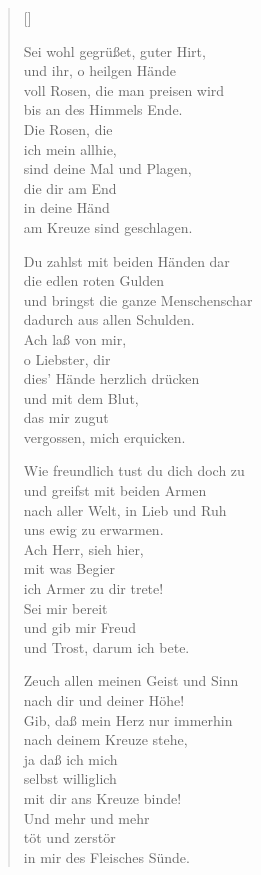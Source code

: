 \begin{multicols}{2}
\settowidth{\versewidth}{Wie freundlich tust du dich doch zu}
\begin{verse}[\versewidth]


 Sei wohl gegrüßet, guter Hirt,\\
und ihr, o heilgen Hände\\
voll Rosen, die man preisen wird\\
bis an des Himmels Ende.\\
Die Rosen, die\\
ich mein allhie,\\
sind deine Mal und Plagen,\\
die dir am End\\
in deine Händ\\
am Kreuze sind geschlagen.

 Du zahlst mit beiden Händen dar\\
die edlen roten Gulden\\
und bringst die ganze Menschenschar\\
dadurch aus allen Schulden.\\
Ach laß von mir,\\
o Liebster, dir\\
dies' Hände herzlich drücken\\
und mit dem Blut,\\
das mir zugut\\
vergossen, mich erquicken.

 Wie freundlich tust du dich doch zu\\
und greifst mit beiden Armen\\
nach aller Welt, in Lieb und Ruh\\
uns ewig zu erwarmen.\\
Ach Herr, sieh hier,\\
mit was Begier\\
ich Armer zu dir trete!\\
Sei mir bereit\\
und gib mir Freud\\
und Trost, darum ich bete.

 Zeuch allen meinen Geist und Sinn\\
nach dir und deiner Höhe!\\
Gib, daß mein Herz nur immerhin\\
nach deinem Kreuze stehe,\\
ja daß ich mich\\
selbst williglich\\
mit dir ans Kreuze binde!\\
Und mehr und mehr\\
töt und zerstör\\
in mir des Fleisches Sünde.
\end{verse}
\end{multicols}

